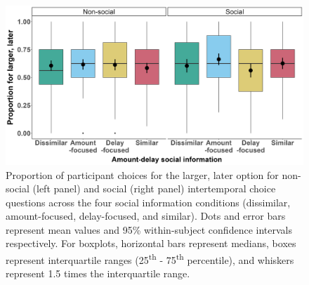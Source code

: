 \documentclass[
  pub,floatsintext]{apa6}
\begin{document}
\begin{figure}

{\centering \includegraphics[width=0.8\linewidth]{figures/itc_social_info_1} 

}

\caption{Proportion of participant choices for the larger, later option for non-social (left panel) and social (right panel) intertemporal choice questions across the four social information conditions (dissimilar, amount-focused, delay-focused, and similar). Dots and error bars represent mean values and 95\% within-subject confidence intervals respectively. For boxplots, horizontal bars represent medians, boxes represent interquartile ranges (25\textsuperscript{th} - 75\textsuperscript{th} percentile), and whiskers represent 1.5 times the interquartile range.}\label{fig:socialinfoitc1}
\end{figure}
\end{document}
